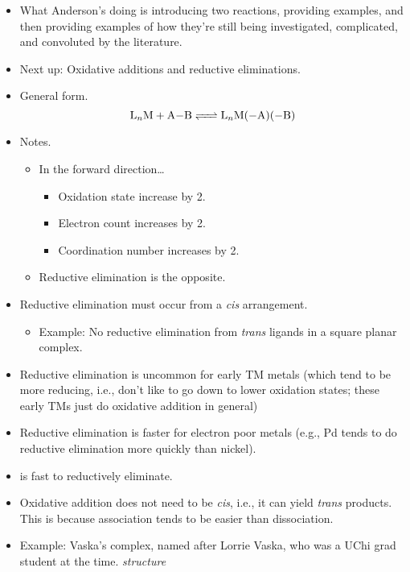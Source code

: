 \documentclass[../notes.tex]{subfiles}
\begin{document}
\begin{itemize}
    \item What Anderson's doing is introducing two reactions, providing examples, and then providing examples of how they're still being investigated, complicated, and convoluted by the literature.
    \item Next up: Oxidative additions and reductive eliminations.
    \item General form.
    \begin{equation*}
        \ce{L_nM + A-B <=> L_nM(-A)(-B)}
    \end{equation*}
    \item Notes.
    \begin{itemize}
        \item In the forward direction\dots
        \begin{itemize}
            \item Oxidation state increase by 2.
            \item Electron count increases by 2.
            \item Coordination number increases by 2.
        \end{itemize}
        \item Reductive elimination is the opposite.
    \end{itemize}
    \item Reductive elimination must occur from a \emph{cis} arrangement.
    \begin{itemize}
        \item Example: No reductive elimination from \emph{trans} ligands in a square planar complex.
    \end{itemize}
    \item Reductive elimination is uncommon for early TM metals (which tend to be more reducing, i.e., don't like to go down to lower oxidation states; these early TMs just do oxidative addition in general)
    \item Reductive elimination is faster for electron poor metals (e.g., Pd tends to do reductive elimination more quickly than nickel).
    \item {} is fast to reductively eliminate.
    \item Oxidative addition does not need to be \emph{cis}, i.e., it can yield \emph{trans} products. This is because association tends to be easier than dissociation.
    \item Example: Vaska's complex, named after Lorrie Vaska, who was a UChi grad student at the time.
    \emph{structure}
    \begin{itemize}

\end{itemize}
\end{itemize}
\end{document}
